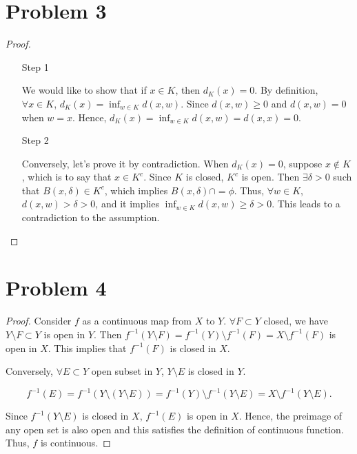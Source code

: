 \documentclass[12pt]{article}
\begin{document}
\section*{Problem 3}
\begin{proof} 
\ 
\begin{enumerate}
\item [Step 1]

We would like to show that if $x\in K$, then $d_K(x) = 0$. By definition, $\forall x\in K$, $d_K(x) = \inf_{w\in K} d(x, w)$. Since $d(x, w) \geqslant 0$ and $d(x, w) = 0$ when $w = x$. Hence, $d_K (x) = \inf_{w\in K} d(x, w) = d(x, x) = 0$.

\item [Step 2]

Conversely, let's prove it by contradiction. When $d_K(x) = 0$, suppose $x \notin K$, which is to say that $x\in K^c$. Since $K$ is closed, $K^c$ is open. Then $\exists \delta > 0 $ such that $B(x, \delta) \in K^c$, which implies $B(x, \delta) \cap = \phi$.  Thus, $\forall w \in K$, $d(x, w) > \delta > 0$, and it implies $\inf_{w\in K} d(x, w) \geqslant \delta > 0$. This leads to a contradiction to the assumption.

\end{enumerate}

\end{proof}

\section*{Problem 4}

\begin{proof}

Consider $f$ as a continuous map from $X$ to $Y$. $\forall F \subset Y$ closed, we have $Y \setminus F \subset Y$ is open in $Y$. Then $f^{-1} (Y\setminus F) = f^{-1}(Y)\setminus f^{-1}(F) = X\setminus f^{-1}(F)$ is open in $X$. This implies that $f^{-1}(F)$ is closed in $X$.

Conversely, $\forall E \subset Y$ open subset in $Y$, $Y\setminus E$ is closed in $Y$. 

$$
f^{-1}(E) = f^{-1}(Y\setminus (Y\setminus E)) = f^{-1}(Y) \setminus f^{-1}(Y\setminus E) = X \setminus f^{-1}(Y\setminus E).
$$

Since $f^{-1}(Y\setminus E)$ is closed in $X$, $f^{-1}(E)$ is open in $X$. Hence, the preimage of any open set is also open and this satisfies the definition of continuous function. Thus, $f$ is continuous. 

\end{proof}
\end{document}
